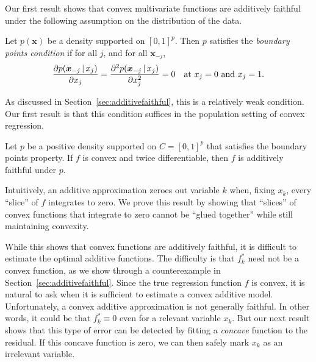 Our first result shows that convex multivariate functions are
additively faithful
under the following assumption on the distribution of the data.
\begin{definition}
  Let $p(\mathbf{x})$ be a density supported on $[0,1]^p$.  Then $p$
  satisfies the \emph{boundary points condition} if for all $j$, and
  for all $\mathbf{x}_{-j}$,
\[
\frac{\partial p(\mbox{\boldmath $x$}_{-j} {\,|\,} x_j)}{\partial x_j}  =  
\frac{\partial^2 p(\mbox{\boldmath $x$}_{-j} {\,|\,} x_j)}{\partial x_j^2} = 0
\quad \textrm{at $x_j = 0$ and $x_j = 1$}.
\]
\end{definition}

As discussed in Section~\ref{sec:additivefaithful}, this is a relatively weak condition. 
Our first result is that this condition suffices in the population
setting of convex regression.

\begin{stheorem}
  Let $p$ be a positive density supported on $C=[0,1]^p$ that
  satisfies the boundary points property. If $f$ is convex and twice
  differentiable, then $f$ is additively faithful under $p$.
\end{stheorem}


Intuitively, an additive approximation zeroes out variable $k$ when, fixing $x_k$, every
``slice'' of $f$ integrates to zero. We prove this result
by showing that ``slices'' of convex
functions that integrate to zero cannot be ``glued together'' while
still maintaining convexity.

While this shows that convex functions are additively faithful, it is difficult to
estimate the optimal additive functions.  The difficulty
is that $f^*_k$ need not be
a convex function, as we show through a counterexample
in Section~\ref{sec:additivefaithful}.   
Since the true regression function $f$ is convex, it is natural to ask
when it is sufficient to estimate a convex additive model.  
Unfortunately, a convex additive approximation is not generally
faithful.  In other words, it could be that $f^*_k\equiv 0$
even for a relevant variable $x_k$.  But our next result
shows that this type of error can be detected by fitting 
a \textit{concave} function to the residual.  If this
concave function is zero, we can then safely
mark $x_k$ as an irrelevant variable.

